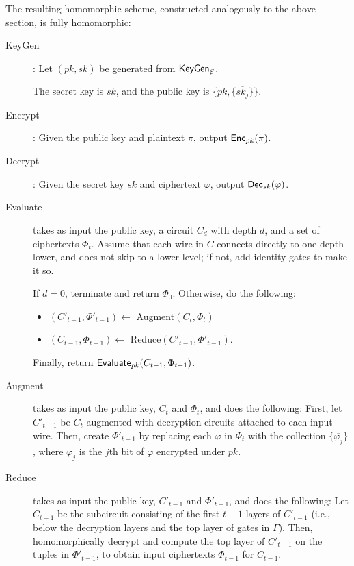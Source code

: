 The resulting homomorphic scheme, constructed analogously to the above section, is fully homomorphic:

\begin{description}
\item[KeyGen]: Let $(pk, sk)$ be generated from ${\sf KeyGen}_\mathcal{E}$.

The secret key is $sk$, and the public key is $\{pk, \{\overline{sk_j}\}\}.$

\item[Encrypt]: Given the public key and plaintext $\pi$, output ${\sf Enc}_{pk}(\pi)$.

\item[Decrypt]: Given the secret key $sk$ and ciphertext $\varphi$, output ${\sf Dec}_{sk}(\varphi)$.

\item[Evaluate] takes as input the public key, a circuit $C_d$ with depth $d$, and a set of ciphertexts $\Phi_t$. Assume that each wire in $C$ connects directly to one depth lower, and does not skip to a lower level; if not, add identity gates to make it so.

If $d=0$, terminate and return $\Phi_0$. Otherwise, do the following:
\begin{itemize}
\item $(C'_{t-1}, \Phi'_{t-1}) \leftarrow$ Augment$(C_t, \Phi_t)$
\item $(C_{t-1}, \Phi_{t-1}) \leftarrow$ Reduce$(C'_{t-1}, \Phi'_{t-1})$.
\end{itemize}

Finally, return ${\sf Evaluate}_{pk}(C_{t-1}, \Phi_{t-1})$.

\item[Augment] takes as input the public key, $C_t$ and $\Phi_t$, and does the following: First, let $C'_{t-1}$ be $C_t$ augmented with decryption circuits attached to each input wire. Then, create $\Phi'_{t-1}$ by replacing each $\varphi$ in $\Phi_t$ with the collection $\{\overline{\varphi_j}\}$, where $\overline{\varphi_j}$ is the $j$th bit of $\varphi$ encrypted under $pk$.

\item[Reduce] takes as input the public key, $C'_{t-1}$ and $\Phi'_{t-1}$, and does the following: Let $C_{t-1}$ be the subcircuit consisting of the first $t-1$ layers of $C'_{t-1}$ (i.e., below the decryption layers and the top layer of gates in $\Gamma$). Then, homomorphically decrypt and compute the top layer of $C'_{t-1}$ on the tuples in $\Phi'_{t-1}$, to obtain input ciphertexts $\Phi_{t-1}$ for $C_{t-1}$.
\end{description}



